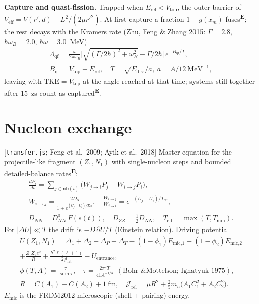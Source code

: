 \documentclass[11pt,a4paper]{article}
\newcommand{\file}[1]{\texttt{\small #1}}
\newcommand{\src}[1]{\hfill{\small\color{gray}[#1]}}
\newcommand{\emp}{\textsuperscript{\color{orange!80!black}\textbf{E}}}
\begin{document}
\textbf{Capture and quasi-fission.} Trapped when $E_\text{rel} < V_\text{top}$, the outer barrier of
$V_\text{eff} = V(r',d) + L^2/(2\mu r'^2)$. At first capture a fraction $1-g(x_m)$ fuses\emp; the rest decays with the Kramers rate
(Zhu, Feng \& Zhang 2015: $\Gamma=2.8$, $\hbar\omega_B=2.0$, $\hbar\omega=3.0$~MeV)
\begin{gather}
\Lambda_\text{qf} = \frac{\omega}{2\pi\omega_B}\Big[\sqrt{(\Gamma/2\hbar)^2+\omega_B^2}-\Gamma/2\hbar\Big]\,e^{-B_\text{qf}/T},\\
B_\text{qf} = V_\text{top}-E_\text{rel},\quad T = \sqrt{E_\text{diss}/a},\ a = A/12~\text{MeV}^{-1},
\end{gather}
leaving with $\text{TKE} = V_\text{top}$ at the angle reached at that time; systems still together after 15~zs count as captured\emp.

\section{Nucleon exchange}
\src{\file{transfer.js}; Feng et al.\ 2009; Ayik et al.\ 2018}
Master equation for the projectile-like fragment $(Z_1,N_1)$ with single-nucleon steps and bounded detailed-balance rates\emp:
\begin{gather}
\frac{dP_i}{dt} = \sum_{j\in\text{nb}(i)}\big(W_{j\to i}P_j - W_{i\to j}P_i\big),\\
W_{i\to j} = \frac{2D_{\alpha}}{1+e^{(U_j-U_i)/T_\text{eff}}},\quad \frac{W_{i\to j}}{W_{j\to i}} = e^{-(U_j-U_i)/T_\text{eff}},\\
D_{NN} = D_{NN}^0\,F(s(t)),\quad D_{ZZ} = \tfrac12 D_{NN},\quad T_\text{eff} = \max(T,T_\text{min}).
\end{gather}
For $|\Delta U|\ll T$ the drift is $-D\,\partial U/T$ (Einstein relation). Driving potential
\begin{gather}
U(Z_1,N_1) = \Delta_1+\Delta_2-\Delta_P-\Delta_T - (1-\phi_1)E_\text{mic,1} - (1-\phi_2)E_\text{mic,2}\\
+ \frac{Z_1Z_2e^2}{R} + \frac{\hbar^2\ell(\ell+1)}{2\mathcal J_\text{rel}} - U_\text{entrance},\\
\phi(T,A) = \frac{\tau}{\sinh\tau},\quad \tau = \frac{2\pi^2T}{41A^{-1/3}}\ \ (\text{Bohr \& Mottelson; Ignatyuk 1975}),\\
R = C(A_1)+C(A_2)+1~\text{fm},\quad \mathcal J_\text{rel} = \mu R^2 + \tfrac25 m_u\big(A_1C_1^2+A_2C_2^2\big).
\end{gather}
$E_\text{mic}$ is the FRDM2012 microscopic (shell + pairing) energy.
\end{document}
